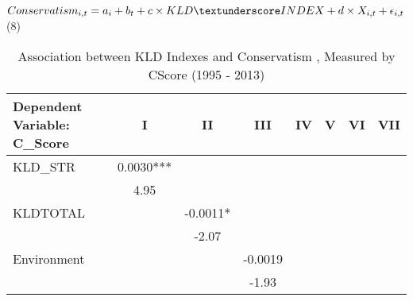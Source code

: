 \begin{landscape}
	\begin{table}[H]
		\centering
		\caption{Association between KLD Indexes and Conservatism , Measured by C\textunderscore Score (1995 - 2013)}
		
		$Conservatism_{i,t}=a_i+b_t+c\times KLD\textunderscore INDEX+d\times X_{i,t}+\epsilon_{i,t}$ \qquad (8)
		
		\begin{tabular}{lccccccc}
			\toprule
			\toprule
			Dependent Variable: C\_Score & I     & II    & III   & IV    & V     & VI    & VII \\
			\midrule
			KLD\_STR & \cellcolor[rgb]{ .906,  .902,  .902}0.0030*** & \cellcolor[rgb]{ .906,  .902,  .902} & \cellcolor[rgb]{ .906,  .902,  .902} & \cellcolor[rgb]{ .906,  .902,  .902} & \cellcolor[rgb]{ .906,  .902,  .902} & \cellcolor[rgb]{ .906,  .902,  .902} & \cellcolor[rgb]{ .906,  .902,  .902}              \\
			& \cellcolor[rgb]{ .906,  .902,  .902}4.95 & \cellcolor[rgb]{ .906,  .902,  .902} & \cellcolor[rgb]{ .906,  .902,  .902} & \cellcolor[rgb]{ .906,  .902,  .902} & \cellcolor[rgb]{ .906,  .902,  .902} & \cellcolor[rgb]{ .906,  .902,  .902} & \cellcolor[rgb]{ .906,  .902,  .902} \\
			KLD\textunderscore TOTAL   & \cellcolor[rgb]{ .906,  .902,  .902} & \cellcolor[rgb]{ .906,  .902,  .902}-0.0011* & \cellcolor[rgb]{ .906,  .902,  .902} & \cellcolor[rgb]{ .906,  .902,  .902} & \cellcolor[rgb]{ .906,  .902,  .902} & \cellcolor[rgb]{ .906,  .902,  .902} & \cellcolor[rgb]{ .906,  .902,  .902} \\
			& \cellcolor[rgb]{ .906,  .902,  .902} & \cellcolor[rgb]{ .906,  .902,  .902}-2.07 & \cellcolor[rgb]{ .906,  .902,  .902} & \cellcolor[rgb]{ .906,  .902,  .902} & \cellcolor[rgb]{ .906,  .902,  .902} & \cellcolor[rgb]{ .906,  .902,  .902} & \cellcolor[rgb]{ .906,  .902,  .902} \\
			Environment & \cellcolor[rgb]{ .906,  .902,  .902} & \cellcolor[rgb]{ .906,  .902,  .902} & \cellcolor[rgb]{ .906,  .902,  .902}-0.0019 & \cellcolor[rgb]{ .906,  .902,  .902} & \cellcolor[rgb]{ .906,  .902,  .902} & \cellcolor[rgb]{ .906,  .902,  .902} & \cellcolor[rgb]{ .906,  .902,  .902} \\
			& \cellcolor[rgb]{ .906,  .902,  .902} & \cellcolor[rgb]{ .906,  .902,  .902} & \cellcolor[rgb]{ .906,  .902,  .902}-1.93 & \cellcolor[rgb]{ .906,  .902,  .902} & \cellcolor[rgb]{ .906,  .902,  .902} & \cellcolor[rgb]{ .906,  .902,  .902} & \cellcolor[rgb]{ .906,  .902,  .902} \\

\end{tabular}
\end{table}
\end{landscape}
